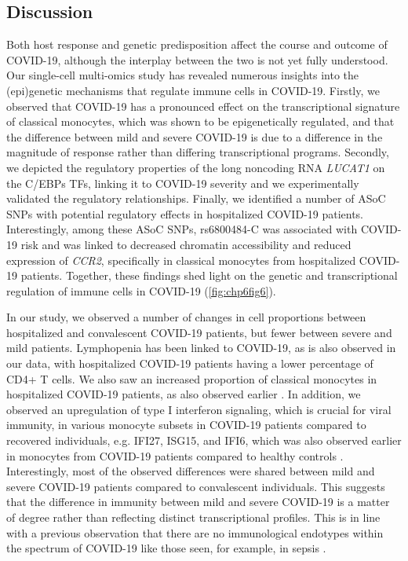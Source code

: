 \documentclass{book}
\begin{document}
\begin{refsection}
\section*{Discussion}
Both host response and genetic predisposition affect the course and outcome of COVID-19, although the interplay between the two is not yet fully understood.
Our single-cell multi-omics study has revealed numerous insights into the (epi)genetic mechanisms that regulate immune cells in COVID-19.
Firstly, we observed that COVID-19 has a pronounced effect on the transcriptional signature of classical monocytes, which was shown to be epigenetically regulated, and that the difference between mild and severe COVID-19 is due to a difference in the magnitude of response rather than differing transcriptional programs.
Secondly, we depicted the regulatory properties of the long noncoding RNA \textit{LUCAT1} on the C/EBPs TFs, linking it to COVID-19 severity and we experimentally validated the regulatory relationships.
Finally, we identified a number of ASoC SNPs with potential regulatory effects in hospitalized COVID-19 patients.
Interestingly, among these ASoC SNPs, rs6800484-C was associated with COVID-19 risk and was linked to decreased chromatin accessibility and reduced expression of \textit{CCR2}, specifically in classical monocytes from hospitalized COVID-19 patients.
Together, these findings shed light on the genetic and transcriptional regulation of immune cells in COVID-19 (\ref{fig:chp6fig6}).

In our study, we observed a number of changes in cell proportions between hospitalized and convalescent COVID-19 patients, but fewer between severe and mild patients.
Lymphopenia has been linked to COVID-19, as is also observed in our data, with hospitalized COVID-19 patients having a lower percentage of CD4+ T cells.
We also saw an increased proportion of classical monocytes in hospitalized COVID-19 patients, as also observed earlier \cite{Zhang2020Single}.
In addition, we observed an upregulation of type I interferon signaling, which is crucial for viral immunity, in various monocyte subsets in COVID-19 patients compared to recovered individuals, e.g. IFI27, ISG15, and IFI6, which was also observed earlier in monocytes from COVID-19 patients compared to healthy controls \cite{Zhang2020Single}.
Interestingly, most of the observed differences were shared between mild and severe COVID-19 patients compared to convalescent individuals.
This suggests that the difference in immunity between mild and severe COVID-19 is a matter of degree rather than reflecting distinct transcriptional profiles.
This is in line with a previous observation that there are no immunological endotypes within the spectrum of COVID-19 \cite{Janssen2021Dysregulated} like those seen, for example, in sepsis \cite{Reyes2021Plasma}.


\end{refsection}
\end{document}
